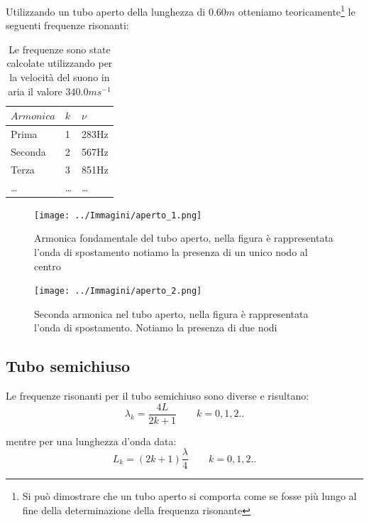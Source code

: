 \documentclass[a4paper,10pt,oneside]{article}
\begin{document}
Utilizzando un tubo aperto della lunghezza di $0.60m$ otteniamo teoricamente\footnote{Si può dimostrare che un tubo aperto si comporta come se fosse più lungo al fine della determinazione della frequenza risonante} le seguenti frequenze risonanti:


\begin{table}[H]
\begin{center}
\begin{tabular}{lll}\toprule
$Armonica$ &$k$&$\nu$\\ \midrule
Prima & 1 & 283Hz\\
Seconda & 2&567Hz\\
Terza & 3&851Hz\\
\ldots &\ldots&\ldots \\ \bottomrule
\end{tabular}\caption{Le frequenze sono state calcolate utilizzando per la velocità del suono in aria il valore $340.0ms^{-1}$}\label{tab:aperto}
\end{center}
\end{table}


\begin{figure}[H]
 \centering
 \texttt{[image: ../Immagini/aperto\_1.png]}
 \caption{Armonica fondamentale del tubo aperto, nella figura è rappresentata l'onda di spostamento notiamo la presenza di un unico nodo al centro}
 \label{fig:aperto_fondamentale}
\end{figure}

\begin{figure}[H]
 \centering
 \texttt{[image: ../Immagini/aperto\_2.png]}
 \caption{Seconda armonica nel tubo aperto, nella figura è rappresentata l'onda di spostamento. Notiamo la presenza di due nodi}
 \label{fig:aperto_seconda}
\end{figure}



\subsection{Tubo semichiuso}

Le frequenze risonanti per il tubo semichiuso sono diverse e risultano:
\begin{equation}\label{chiuso_1}
 \lambda_k=\frac{4L}{2k+1}\qquad k=0,1,2..
\end{equation}

mentre per una lunghezza d'onda data:
\begin{equation}\label{chiuso_2}
 L_k=(2k+1)\frac{\lambda}{4}\qquad k=0,1,2..
\end{equation}
\end{document}
